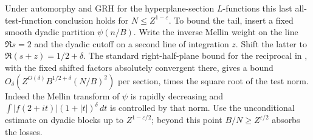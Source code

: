 \documentclass[11pt,letterpaper]{article}
\theoremstyle{definition}
\begin{document}
Under automorphy and GRH for the hyperplane-section $L$-functions
this last all-test-function conclusion holds for $N\le
Z^{1-\varepsilon}$. To bound the tail, insert a fixed smooth dyadic
partition $\psi(n/B)$. Write the inverse Mellin weight on the line
$\Re s=2$ and the dyadic cutoff on a second line of integration
$z$. Shift the latter to $\Re(s+z)=1/2+\delta$. The standard
right-half-plane bound for the reciprocal in
\cite[Proposition 3.2]{c3:wang}, with the fixed shifted factors
absolutely convergent there, gives a bound
$O_\delta(Z^{O(\delta)} B^{1/2+\delta}(N/B)^2)$ per section,
times the square root of the test norm. Indeed the Mellin transform
of $\psi$ is rapidly decreasing and
$\int|f(2+it)|(1+|t|)^\delta\,dt$ is controlled by that norm.
Use the unconditional estimate on dyadic blocks up to
$Z^{1-\varepsilon/2}$; beyond this point $B/N\ge
Z^{\varepsilon/2}$ absorbs the losses.
\end{document}
